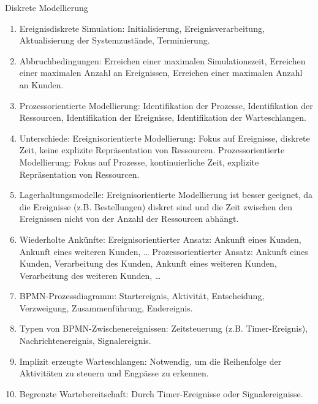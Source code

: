 \documentclass{article}
\begin{document}
\begin{exercise}{Diskrete Modellierung}
  \begin{solution}
    \begin{enumerate}
      \item Ereignisdiskrete Simulation: Initialisierung, Ereignisverarbeitung, Aktualisierung der Systemzustände, Terminierung.
      \item Abbruchbedingungen: Erreichen einer maximalen Simulationszeit, Erreichen einer maximalen Anzahl an Ereignissen, Erreichen einer maximalen Anzahl an Kunden.
      \item Prozessorientierte Modellierung: Identifikation der Prozesse, Identifikation der Ressourcen, Identifikation der Ereignisse, Identifikation der Warteschlangen.
      \item Unterschiede: Ereignisorientierte Modellierung: Fokus auf Ereignisse, diskrete Zeit, keine explizite Repräsentation von Ressourcen. Prozessorientierte Modellierung: Fokus auf Prozesse, kontinuierliche Zeit, explizite Repräsentation von Ressourcen.
      \item Lagerhaltungsmodelle: Ereignisorientierte Modellierung ist besser geeignet, da die Ereignisse (z.B. Bestellungen) diskret sind und die Zeit zwischen den Ereignissen nicht von der Anzahl der Ressourcen abhängt.
      \item Wiederholte Ankünfte: Ereignisorientierter Ansatz: Ankunft eines Kunden, Ankunft eines weiteren Kunden, … Prozessorientierter Ansatz: Ankunft eines Kunden, Verarbeitung des Kunden, Ankunft eines weiteren Kunden, Verarbeitung des weiteren Kunden, …
      \item BPMN-Prozessdiagramm: Startereignis, Aktivität, Entscheidung, Verzweigung, Zusammenführung, Endereignis.
      \item Typen von BPMN-Zwischenereignissen: Zeitsteuerung (z.B. Timer-Ereignis), Nachrichtenereignis, Signalereignis.
      \item Implizit erzeugte Warteschlangen: Notwendig, um die Reihenfolge der Aktivitäten zu steuern und Engpässe zu erkennen.
      \item Begrenzte Wartebereitschaft: Durch Timer-Ereignisse oder Signalereignisse.
    \end{enumerate}
  \end{solution}
\end{exercise}
\end{document}

